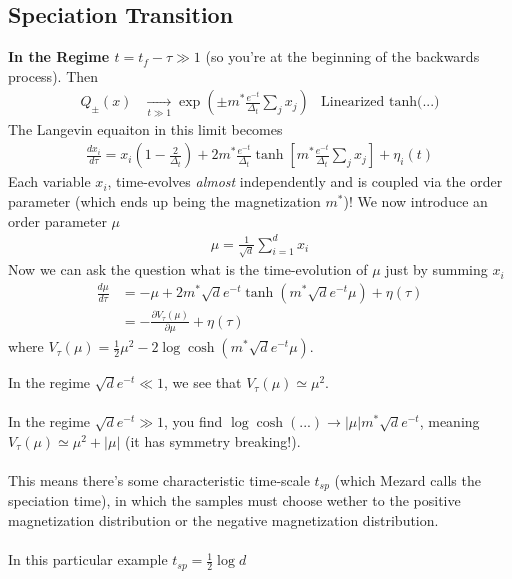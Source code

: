 \subsection{Speciation Transition}
\textbf{In the Regime ${t = t_{f} - \tau \gg 1}$} (so you're at the beginning of the backwards process). Then
\begin{align}
	Q_{\pm}(x) & \underset{t \gg 1}{\to} \exp\left(\pm m^* \frac{e^{-t}}{\Delta_t} \sum_j x_j \right) & \text{Linearized tanh(...)}
\end{align}
The Langevin equaiton in this limit becomes
\begin{align}
	\frac{dx_i}{d\tau} = x_i(1 - \frac{2}{\Delta_t} ) + 2 m^* \frac{e^{-t}}{\Delta_t} \tanh [m^* \frac{e^{-t}}{\Delta_t} \sum_j x_j] + \eta_i(t)
\end{align}
Each variable $x_i$, time-evolves \emph{almost} independently and is coupled via the order parameter (which ends up being the magnetization $m^*$)! We now introduce an order parameter $\mu$
\begin{align}
	\mu = \frac{1}{\sqrt{d}} \sum_{i=1}^d x_i
\end{align}
Now we can ask the question what is the time-evolution of $\mu$ just by summing $x_i$
\begin{align}
	\frac{d\mu}{d\tau} & = - \mu + 2 m^* \sqrt{d} e^{-t} \tanh(m^* \sqrt{d} e^{-t} \mu) + \eta(\tau)\\
	& =- \frac{\partial V_\tau(\mu)}{\partial \mu} + \eta(\tau)
\end{align}
where $V_\tau(\mu) = \frac{1}{2}\mu^2 - 2 \log \cosh(m^* \sqrt{d} e^{-t} \mu)$.
\begin{sidework}
	In the regime $\sqrt{d}e^{-t} \ll 1$, we see that $V_\tau(\mu) \simeq \mu^2$.\\
	\\
	In the regime $\sqrt{d} e^{-t} \gg 1$, you find $\log \cosh(...) \to  |\mu| m^* \sqrt{d} e^{-t}$, meaning $V_\tau(\mu) \simeq \mu^2  + |\mu|$ (it has symmetry breaking!).\\
	\\
	This means there's some characteristic time-scale $t_{sp}$ (which Mezard calls the speciation time), in which the samples must choose wether to the positive magnetization distribution or the negative magnetization distribution. \\
	\\
	In this particular example $t_{sp} = \frac{1}{2}\log d$
\end{sidework}
